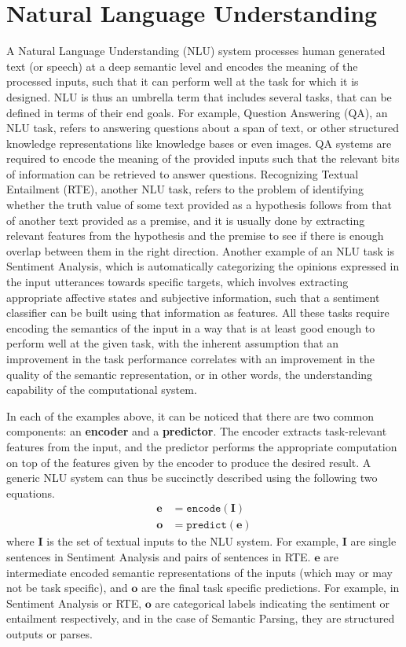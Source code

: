 \section{Natural Language Understanding}
A Natural Language Understanding (NLU) system processes human generated text (or speech) at a deep semantic level and encodes the meaning
of the processed inputs, such that it can perform well at the task for which it is designed. NLU is thus an umbrella term that includes several
tasks, that can be defined in terms of their end goals. For example, Question Answering (QA), an NLU task, refers to answering questions about a span of text,
or other structured knowledge representations like knowledge bases or even images.
QA systems are required to encode the meaning of the provided inputs such that the relevant bits of information can be retrieved to answer questions.
Recognizing Textual Entailment (RTE), another NLU task, refers to the problem of identifying whether the truth value of some text provided as a hypothesis follows from that of another 
text provided as a premise, and it is usually done by extracting relevant features from the hypothesis and the premise to see if there is enough
overlap between them in the right direction. Another example of an NLU task is Sentiment Analysis, which is automatically categorizing the opinions expressed in the input
utterances towards specific targets, which involves extracting appropriate affective states and subjective information, such that a sentiment classifier
can be built using that information as features. All these tasks require encoding the semantics of the input in a way that is
at least good enough to perform well at the given task, with the inherent assumption that an improvement in the task performance correlates with an improvement in the
quality of the semantic representation, or in other words, the understanding capability of the computational system.

In each of the examples above, it can be noticed that there are two common components: an \textbf{encoder} and a \textbf{predictor}. The encoder
extracts task-relevant features from the input, and the predictor performs the appropriate computation on top of the features given by the encoder
to produce the desired result. A generic NLU system can thus be succinctly described using the
following two equations.
\begin{align}
 \mathbf{e} &= \mathtt{encode}(\mathbf{I}) \label{eq:generic_encoding}\\
 \mathbf{o} &= \mathtt{predict}(\mathbf{e}) \label{eq:generic_prediction}
\end{align}
where $\mathbf{I}$ is the set of textual inputs to the NLU system. 
For example, $\mathbf{I}$  are single sentences in Sentiment Analysis and pairs of sentences in RTE. $\textbf{e}$ are intermediate 
encoded semantic representations of the inputs (which may or may not be task specific), and $\mathbf{o}$ are the final task specific predictions. For example, in Sentiment Analysis or RTE, 
$\mathbf{o}$ are categorical labels indicating the sentiment or entailment respectively, and in the case of Semantic Parsing, they are structured outputs or parses.

